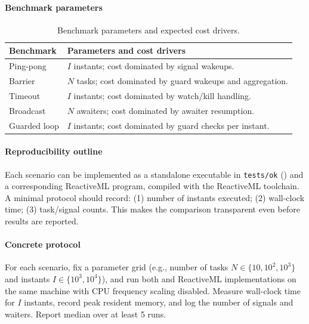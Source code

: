 \paragraph{Benchmark parameters}
\begin{table}[h]
\centering
\begin{tabularx}{\linewidth}{lY}
\hline
Benchmark & Parameters and cost drivers \\ \hline
Ping-pong & $I$ instants; cost dominated by signal wakeups. \\
Barrier   & $N$ tasks; cost dominated by guard wakeups and aggregation. \\
Timeout   & $I$ instants; cost dominated by watch/kill handling. \\
Broadcast & $N$ awaiters; cost dominated by awaiter resumption. \\
Guarded loop & $I$ instants; cost dominated by guard checks per instant. \\ \hline
\end{tabularx}
\caption{Benchmark parameters and expected cost drivers.}
\end{table}

\paragraph{Reproducibility outline}
Each scenario can be implemented as a standalone executable in
\texttt{tests/ok} (\tempo{}) and a corresponding ReactiveML program, compiled with
the ReactiveML toolchain. A minimal protocol should record: (1) number of
instants executed; (2) wall-clock time; (3) task/signal counts. This makes the
comparison transparent even before results are reported.

\paragraph{Concrete protocol}
For each scenario, fix a parameter grid (e.g., number of tasks $N \in
\{10, 10^2, 10^3\}$ and instants $I \in \{10^3, 10^4\}$), and run both \tempo{} and
ReactiveML implementations on the same machine with CPU frequency scaling
disabled. Measure wall-clock time for $I$ instants, record peak resident memory,
and log the number of signals and waiters. Report median over at least 5 runs.

